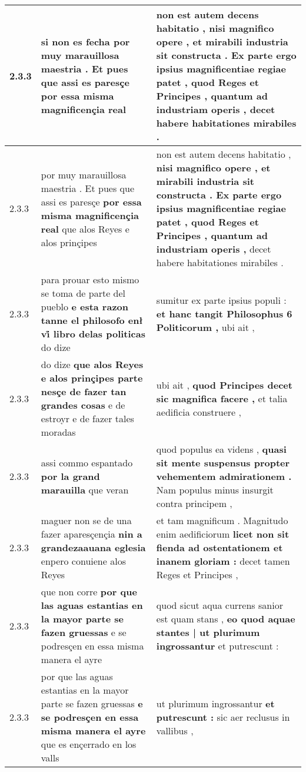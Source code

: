 \begin{tabular}{|p{1cm}|p{6.5cm}|p{6.5cm}|}
2.3.3 & si non es fecha \textbf{ por muy marauillosa maestria . Et pues que assi es paresçe } por essa misma magnificençia real & non est autem decens habitatio , \textbf{ nisi magnifico opere , et mirabili industria sit constructa . Ex parte ergo ipsius magnificentiae regiae patet , quod Reges et Principes , quantum ad industriam operis , } decet habere habitationes mirabiles . \\\hline
2.3.3 & por muy marauillosa maestria . Et pues que assi es paresçe \textbf{ por essa misma magnificençia real } que alos Reyes e alos prinçipes & non est autem decens habitatio , \textbf{ nisi magnifico opere , et mirabili industria sit constructa . Ex parte ergo ipsius magnificentiae regiae patet , quod Reges et Principes , quantum ad industriam operis , } decet habere habitationes mirabiles . \\\hline
2.3.3 & para prouar esto mismo se toma de parte del pueblo \textbf{ e esta razon tanne el philosofo enł vi̊ libro delas politicas } do dize & sumitur ex parte ipsius populi : \textbf{ et hanc tangit Philosophus 6 Politicorum , } ubi ait , \\\hline
2.3.3 & do dize \textbf{ que alos Reyes e alos prinçipes parte nesçe de fazer tan grandes cosas } e de estroyr e de fazer tales moradas & ubi ait , \textbf{ quod Principes decet sic magnifica facere , } et talia aedificia construere , \\\hline
2.3.3 & assi commo espantado \textbf{ por la grand marauilla } que veran & quod populus ea videns , \textbf{ quasi sit mente suspensus propter vehementem admirationem . } Nam populus minus insurgit contra principem , \\\hline
2.3.3 & maguer non se de una fazer aparesçençia \textbf{ nin a grandezaauana eglesia } enpero conuiene alos Reyes & et tam magnificum . Magnitudo enim aedificiorum \textbf{ licet non sit fienda ad ostentationem et inanem gloriam : } decet tamen Reges et Principes , \\\hline
2.3.3 & que non corre \textbf{ por que las aguas estantias en la mayor parte se fazen gruessas } e se podresçen en essa misma manera el ayre & quod sicut aqua currens sanior est quam stans , \textbf{ eo quod aquae stantes | ut plurimum ingrossantur } et putrescunt : \\\hline
2.3.3 & por que las aguas estantias en la mayor parte se fazen gruessas \textbf{ e se podresçen en essa misma manera el ayre } que es ençerrado en los valls & ut plurimum ingrossantur \textbf{ et putrescunt : } sic aer reclusus in vallibus , \\\hline

\end{tabular}

